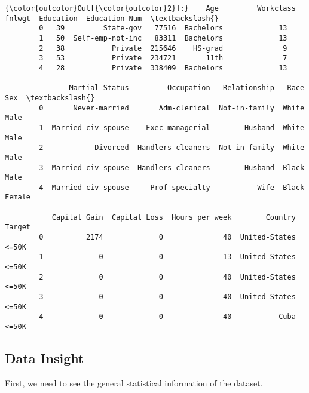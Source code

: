 \documentclass[11pt]{article}
\begin{document}
\begin{Verbatim}[commandchars=\\\{\}]
{\color{outcolor}Out[{\color{outcolor}2}]:}    Age         Workclass  fnlwgt  Education  Education-Num  \textbackslash{}
        0   39         State-gov   77516  Bachelors             13   
        1   50  Self-emp-not-inc   83311  Bachelors             13   
        2   38           Private  215646    HS-grad              9   
        3   53           Private  234721       11th              7   
        4   28           Private  338409  Bachelors             13   
        
               Martial Status         Occupation   Relationship   Race     Sex  \textbackslash{}
        0       Never-married       Adm-clerical  Not-in-family  White    Male   
        1  Married-civ-spouse    Exec-managerial        Husband  White    Male   
        2            Divorced  Handlers-cleaners  Not-in-family  White    Male   
        3  Married-civ-spouse  Handlers-cleaners        Husband  Black    Male   
        4  Married-civ-spouse     Prof-specialty           Wife  Black  Female   
        
           Capital Gain  Capital Loss  Hours per week        Country Target  
        0          2174             0              40  United-States  <=50K  
        1             0             0              13  United-States  <=50K  
        2             0             0              40  United-States  <=50K  
        3             0             0              40  United-States  <=50K  
        4             0             0              40           Cuba  <=50K  
\end{Verbatim}
            
    \subsection{Data Insight}\label{data-insight}

First, we need to see the general statistical information of the
dataset.
\end{document}
